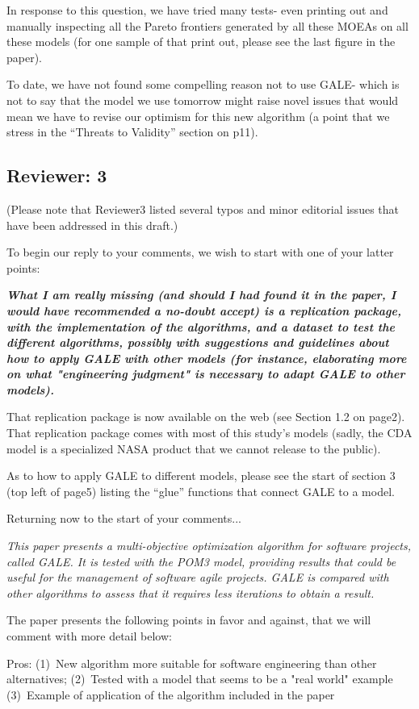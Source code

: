 \documentclass[10pt,journal,compsoc]{IEEEtran}
\begin{document}
In response to this question, we have tried many
tests- even printing out and manually inspecting all
the Pareto frontiers generated by all these
MOEAs on all these models (for one sample of
that print out, please see the last figure in the
paper).

To date, we have not found some compelling reason not to use GALE- which is not to say that the
model we use tomorrow might raise novel issues that would mean we have to revise our optimism for
this new algorithm (a point that we stress in the ``Threats to Validity'' 
section on p11).



\subsection*{Reviewer: 3}

(Please note that Reviewer3 listed several typos and minor editorial issues
that have been addressed in this draft.)

To begin our reply to your comments, we wish to start with one of
your latter points:

{\bf {\em What I am really missing (and should I had
    found it in the paper, I would have recommended
    a no-doubt accept) is a replication package,
    with the implementation of the algorithms, and a
    dataset to test the different algorithms,
    possibly with suggestions and guidelines about
    how to apply GALE with other models (for
    instance, elaborating more on what "engineering
    judgment" is necessary to adapt GALE to other
    models). }}

That replication package is now available on the web (see Section 1.2 on page2).
That replication package comes with most
of this study's  models  (sadly, the CDA
model is a specialized NASA product that we cannot
release to the public).

As to how to apply GALE to different models, please
see the start of section 3 (top left of page5)
listing the ``glue'' functions that connect GALE to
a model.

Returning now to the start of your comments...

{\bf {\em This paper presents a multi-objective
    optimization algorithm for software projects,
    called GALE. It is tested with the POM3 model,
    providing results that could be useful for the
    management of software agile projects. GALE is
    compared with other algorithms to assess that it
    requires less iterations to obtain a result.

The paper presents the following points in favor and against, that we will comment with more detail below:

Pros: (1)~New algorithm more suitable for software engineering than other alternatives;
(2)~Tested with a model that seems to be a "real world" example
(3)~Example of application of the algorithm included in the paper
}}
\end{document}

